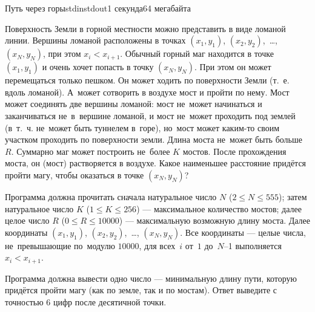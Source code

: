 \begin{problem}{Путь через горы}{stdin}{stdout}{1 секунда}{64 мегабайта}

Поверхность Земли в горной местности можно представить в виде ломаной линии.
Вершины ломаной расположены в точках $(x_1,y_1)$, $(x_2,y_2)$,~\ldots, 
$(x_N,y_N)$, при этом $x_i<x_{i+1}$.
Обычный горный маг находится в точке $(x_1,y_1)$ и очень хочет попасть 
в точку $(x_N,y_N)$. При этом он может перемещаться только пешком. 
Он может ходить по поверхности Земли (т.~е. вдоль ломаной). А~может
сотворить в воздухе мост и пройти по нему. Мост может соединять две вершины
ломаной: мост не~может начинаться и заканчиваться не~в~вершине ломаной, 
и мост не~может проходить под землей (в~т.~ч. не~может быть туннелем в~горе),
но~мост может каким-то своим участком проходить по поверхности земли. 
Длина моста не~может быть больше~$R$. Суммарно маг может построить 
не~более $K$ мостов. После прохождения моста, он (мост) растворяется 
в воздухе. Какое наименьшее расстояние придётся пройти магу, 
чтобы оказаться в точке $(x_N,y_N)$?

\InputFile
Программа должна прочитать сначала натуральное число $N$ 
($2\leqslant N\leqslant 555$);
затем натуральное число $K$ ($1\leqslant K\leqslant 256$) ---
максимальное количество мостов;
далее целое число $R$ ($0\leqslant R\leqslant 10000$) --- максимальную 
возможную длину моста. Далее координаты $(x_1,y_1)$, $(x_2,y_2)$,~\dots, 
$(x_N,y_N)$. 
Все координаты --- целые числа, не~превышающие по~модулю $10000$, 
для всех~$i$ от~$1$ до~$N$--1 выполняется $x_i<x_{i+1}$.


\OutputFile
Программа должна вывести одно число --- минимальную длину пути, 
которую придётся пройти магу (как по земле, так и по мостам). 
Ответ выведите с точностью 6 цифр после десятичной точки.

\Examples

\begin{example}
%
\end{example}

\end{problem}
